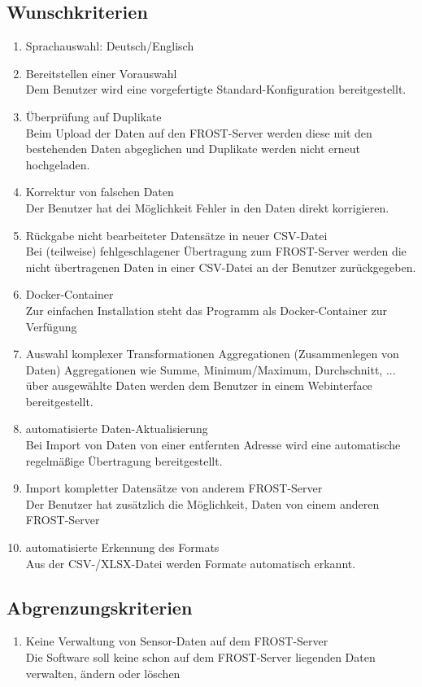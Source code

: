 \documentclass[12 pt]{article}
\begin{document}
\subsection{Wunschkriterien}
\begin{enumerate}
\item Sprachauswahl: Deutsch/Englisch
\item Bereitstellen einer Vorauswahl \\
	Dem Benutzer wird eine vorgefertigte Standard-Konfiguration bereitgestellt.
\item Überprüfung auf Duplikate \\
	Beim Upload der Daten auf den FROST-Server werden diese mit den bestehenden Daten abgeglichen und Duplikate werden nicht erneut hochgeladen.
\item Korrektur von falschen Daten \\
	Der Benutzer hat dei Möglichkeit Fehler in den Daten direkt korrigieren.
\item Rückgabe nicht bearbeiteter Datensätze in neuer CSV-Datei \\
	Bei (teilweise) fehlgeschlagener Übertragung zum FROST-Server werden die nicht übertragenen Daten in einer CSV-Datei an der Benutzer zurückgegeben.
\item Docker-Container \\
	Zur einfachen Installation steht das Programm als Docker-Container zur Verfügung
\item Auswahl komplexer Transformationen Aggregationen (Zusammenlegen von Daten)
	Aggregationen wie Summe, Minimum/Maximum, Durchschnitt, ... über ausgewählte Daten werden dem Benutzer in einem Webinterface bereitgestellt.
\item automatisierte Daten-Aktualisierung \\
	Bei Import von Daten von einer entfernten Adresse wird eine automatische regelmäßige Übertragung bereitgestellt.
\item Import kompletter Datensätze von anderem FROST-Server \\
	Der Benutzer hat zusätzlich die Möglichkeit, Daten von einem anderen FROST-Server 
\item automatisierte Erkennung des Formats \\
	Aus der CSV-/XLSX-Datei werden Formate automatisch erkannt.


\end{enumerate}

\subsection{Abgrenzungskriterien}
\begin{enumerate}
\item Keine Verwaltung von Sensor-Daten auf dem FROST-Server \\
	Die Software soll keine schon auf dem FROST-Server liegenden Daten verwalten, ändern oder löschen
\end{enumerate}
\end{document}

